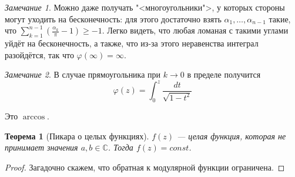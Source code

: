 \documentclass[12pt]{article}
\renewcommand{\C}{\mathbb{C}}
\newcounter{cnt}
\theoremstyle{thmnote}
\newtheorem{theorem}[cnt]{Теорема}
\theoremstyle{remark}
\newtheorem*{remark}{Замечание}
\theoremstyle{defnote}
\begin{document}
\begin{remark}
    Можно даже получать "<многоугольники">, у которых стороны могут уходить на бесконечность: для этого достаточно взять $\alpha_1, \hdots, \alpha_{n-1}$ такие, что $\sum_{k=1}^{n-1} \left(\frac{\alpha_k}{\pi} - 1\right) \geq -1$. Легко видеть, что любая ломаная с такими углами уйдёт на бесконечность, а также, что из-за этого неравенства интеграл разойдётся, так что $\varphi(\infty) = \infty$.
\end{remark}

\begin{remark}
    В случае прямоугольника при $k \to 0$ в пределе получится
    \begin{equation*}
        \varphi(z) = \int_0^z \frac{dt}{\sqrt{1 - t^2}}
    \end{equation*}
    \begin{center}
    \begin{tikzpicture}
         
    \end{tikzpicture}
    \end{center}
    Это $\arccos$.
\end{remark}

\begin{theorem}[Пикара о целых функциях]
\label{picard}
    $f(z)$ --- целая функция, которая не принимает значения $a, b \in \C$. Тогда $f(z) = const$.
\end{theorem}
\begin{proof}
    Загадочно скажем, что обратная к модулярной функции ограничена.
\end{proof}
\end{document}
